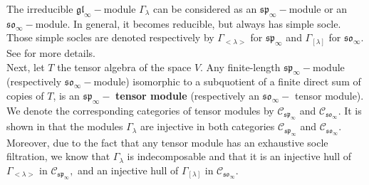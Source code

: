 \documentclass[main.tex]{subfiles}
\begin{document}
\bigskip
The irreducible $\mathfrak{gl}_\infty-$module $\Gamma_\lambda$ can be considered as an  $\mathfrak{sp}_\infty-$module or an $\mathfrak{so}_\infty-$module. In general, it becomes reducible, but always has simple socle. Those simple socles are denoted respectively by $\Gamma_{<\lambda>}$ for $\mathfrak{sp}_\infty$ and $\Gamma_{[\lambda]}$ for $\mathfrak{so}_\infty.$ See \cite{penkov2007tensorrepresentationsclassicallocally} for more details. \\


Next, let $T$ the tensor algebra of the space $V$. Any finite-length $\mathfrak{sp_\infty}-$module (respectively $ \mathfrak{so_\infty}-$module) isomorphic to a subquotient of a finite direct sum of copies of $T$, is an $\mathfrak{sp_\infty}-$ \textbf{tensor module}  (respectively an $\mathfrak{so_\infty}-$ tensor module). We denote the corresponding categories of tensor modules by $\mathbf{\mathcal{C}_{\mathfrak{sp_\infty}}}$ and $\mathbf{\mathcal{C}_{\mathfrak{so_\infty}}}$. It is shown in \cite{dancohen2012koszulcategoryrepresentationsfinitary} that the modules $\Gamma_{\lambda}$ are injective in both categories $\mathcal{C}_{\mathfrak{sp_\infty}}$ and $\mathcal{C}_{\mathfrak{so_\infty}}$. Moreover, due to the fact that any tensor module has an exhaustive socle filtration, we know that $\Gamma_\lambda$ is indecomposable and that it is an injective hull of $\Gamma_{<\lambda>}$ in $\mathcal{C}_{\mathfrak{sp}_\infty},$ and an injective hull of $\Gamma_{[\lambda]}$ in $\mathcal{C}_{\mathfrak{so}_\infty}$.
\bigskip
\end{document}
